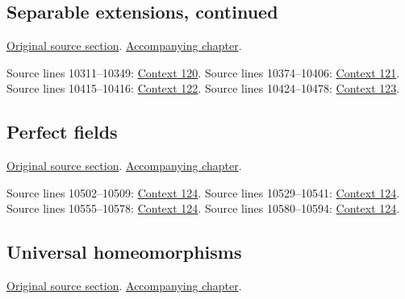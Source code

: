 \subsection{Separable extensions, continued}
\hypertarget{algebra-source-section-separability-continued}{}
\noindent\href{https://github.com/stacks/stacks-project/blob/a04446e57ec1fbc252a871afcec7752fb2807b14/algebra.tex\#L10288}{Original source section}. \href{algebra.pdf\#nameddest=section-separability-continued}{Accompanying chapter}.

\begin{AlgebraSourceRoutes}
 Source lines 10311--10349: \hyperlink{algebra-context-120}{Context 120}.
 Source lines 10374--10406: \hyperlink{algebra-context-121}{Context 121}.
 Source lines 10415--10416: \hyperlink{algebra-context-122}{Context 122}.
 Source lines 10424--10478: \hyperlink{algebra-context-123}{Context 123}.
\end{AlgebraSourceRoutes}

\subsection{Perfect fields}
\hypertarget{algebra-source-section-perfect-fields}{}
\noindent\href{https://github.com/stacks/stacks-project/blob/a04446e57ec1fbc252a871afcec7752fb2807b14/algebra.tex\#L10482}{Original source section}. \href{algebra.pdf\#nameddest=section-perfect-fields}{Accompanying chapter}.

\begin{AlgebraSourceRoutes}
 Source lines 10502--10509: \hyperlink{algebra-context-124}{Context 124}.
 Source lines 10529--10541: \hyperlink{algebra-context-124}{Context 124}.
 Source lines 10555--10578: \hyperlink{algebra-context-124}{Context 124}.
 Source lines 10580--10594: \hyperlink{algebra-context-124}{Context 124}.
\end{AlgebraSourceRoutes}

\subsection{Universal homeomorphisms}
\hypertarget{algebra-source-section-universal-homeomorphism}{}
\noindent\href{https://github.com/stacks/stacks-project/blob/a04446e57ec1fbc252a871afcec7752fb2807b14/algebra.tex\#L10604}{Original source section}. \href{algebra.pdf\#nameddest=section-universal-homeomorphism}{Accompanying chapter}.

